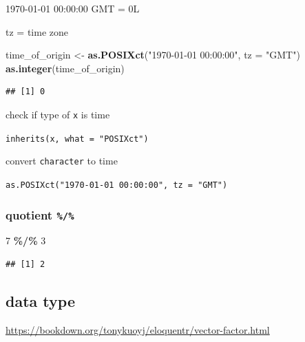 \documentclass[
]{book}
\newenvironment{Shaded}{\begin{snugshade}}{\end{snugshade}}
\newcommand{\AttributeTok}[1]{\textcolor[rgb]{0.13,0.29,0.53}{#1}}
\newcommand{\DecValTok}[1]{\textcolor[rgb]{0.00,0.00,0.81}{#1}}
\newcommand{\FunctionTok}[1]{\textcolor[rgb]{0.13,0.29,0.53}{\textbf{#1}}}
\newcommand{\NormalTok}[1]{#1}
\newcommand{\OtherTok}[1]{\textcolor[rgb]{0.56,0.35,0.01}{#1}}
\newcommand{\SpecialCharTok}[1]{\textcolor[rgb]{0.81,0.36,0.00}{\textbf{#1}}}
\newcommand{\StringTok}[1]{\textcolor[rgb]{0.31,0.60,0.02}{#1}}
\theoremstyle{definition}
\theoremstyle{definition}
\theoremstyle{definition}
\theoremstyle{definition}
\theoremstyle{remark}
\begin{document}
1970-01-01 00:00:00 GMT = 0L

tz = time zone

\begin{Shaded}
\begin{Highlighting}[]
\NormalTok{time\_of\_origin }\OtherTok{\textless{}{-}} \FunctionTok{as.POSIXct}\NormalTok{(}\StringTok{"1970{-}01{-}01 00:00:00"}\NormalTok{, }\AttributeTok{tz =} \StringTok{"GMT"}\NormalTok{)}
\FunctionTok{as.integer}\NormalTok{(time\_of\_origin)}
\end{Highlighting}
\end{Shaded}

\begin{verbatim}
## [1] 0
\end{verbatim}

check if type of \texttt{x} is time

\texttt{inherits(x,\ what\ =\ "POSIXct")}

convert \texttt{character} to time

\texttt{as.POSIXct("1970-01-01\ 00:00:00",\ tz\ =\ "GMT")}

\hypertarget{quotient}{%
\subsubsection{\texorpdfstring{quotient \texttt{\%/\%}}{quotient \%/\%}}\label{quotient}}

\begin{Shaded}
\begin{Highlighting}[]
\DecValTok{7} \SpecialCharTok{\%/\%} \DecValTok{3}
\end{Highlighting}
\end{Shaded}

\begin{verbatim}
## [1] 2
\end{verbatim}

\hypertarget{data-type}{%
\subsection{data type}\label{data-type}}

\url{https://bookdown.org/tonykuoyj/eloquentr/vector-factor.html}
\end{document}
